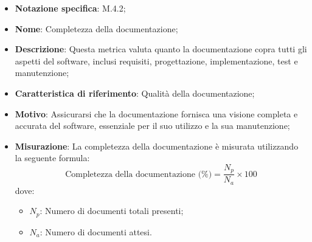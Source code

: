 \begin{itemize}
    \item \textbf{Notazione specifica}: M.4.2;
    \item \textbf{Nome}: Completezza della documentazione;
    \item \textbf{Descrizione}: Questa metrica valuta quanto la documentazione copra tutti gli aspetti del software, inclusi requisiti, progettazione, implementazione, test e manutenzione;
    \item \textbf{Caratteristica di riferimento}: Qualità della documentazione;
    \item \textbf{Motivo}: Assicurarsi che la documentazione fornisca una visione completa e accurata del software, essenziale per il suo utilizzo e la sua manutenzione;
    \item \textbf{Misurazione}: La completezza della documentazione è misurata utilizzando la seguente formula:
    \[
        \text{Completezza della documentazione (\%)} =\frac{{N_p}}{{N_a}} \times 100 
    \]
    dove:
    \begin{itemize}
        \item $N_{p}$: Numero di documenti totali presenti;
        \item $N_{a}$: Numero di documenti attesi.
    \end{itemize}
\end{itemize}
